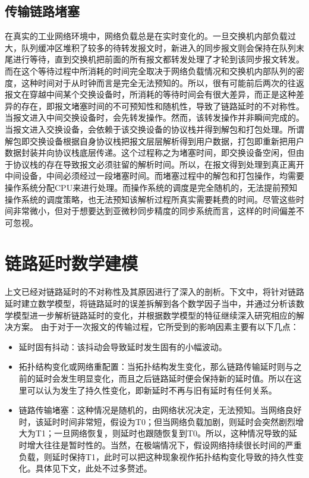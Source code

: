 \subsection{传输链路堵塞}
在真实的工业网络环境中，网络负载总是在实时变化的。一旦交换机内部负载过大，队列缓冲区堆积了较多的待转发报文时，新进入的同步报文则会保持在队列末尾进行等待，直到交换机把前面的所有报文都转发处理了才轮到该同步报文转发。而在这个等待过程中所消耗的时间完全取决于网络负载情况和交换机内部队列的密度，这种时间对于从时钟而言是完全无法预知的。所以，很有可能前后两次的往返报文在穿越中间某个交换设备时，所消耗的等待时间会有很大差异，而正是这种差异的存在，即报文堵塞时间的不可预知性和随机性，导致了链路延时的不对称性。当报文进入中间交换设备时，会先转发操作。然而，该转发操作并非瞬间完成的。当报文进入交换设备，会依赖于该交换设备的协议栈并得到解包和打包处理。所谓解包即交换设备根据自身协议栈把报文层层解析得到用户数据，打包即重新把用户数据封装并向协议栈底层传递。这个过程称之为堵塞时间，即交换设备空闲，但由于协议栈的存在导致报文必须驻留的解析时间。所以，在报文得到处理到真正离开中间设备，中间必须经过一段堵塞时间。而堵塞过程中的解包和打包操作，均需要操作系统分配CPU来进行处理。而操作系统的调度是完全随机的，无法提前预知操作系统的调度策略，也无法预知该解析过程所真实需要耗费的时间。尽管这些时间非常微小，但对于想要达到亚微秒同步精度的同步系统而言，这样的时间偏差不可忽视。

\section{链路延时数学建模}
上文已经对链路延时的不对称性及其原因进行了深入的剖析。下文中，将针对链路延时建立数学模型，将链路延时的误差拆解到各个数学因子当中，并通过分析该数学模型进一步解析链路延时的变化，并根据数学模型的特征继续深入研究相应的解决方案。
由于对于一次报文的传输过程，它所受到的影响因素主要有以下几点：
\begin{itemize}[noitemsep,topsep=0pt,parsep=0pt,partopsep=0pt]
	\item 延时固有抖动：该抖动会导致延时发生固有的小幅波动。
	\item 拓扑结构变化或网络重配置：当拓扑结构发生变化，那么链路传输延时则与之前的延时会发生明显变化，而且之后链路延时便会保持新的延时值。所以在这里可以认为发生了持久性变化，即新延时不再与旧有延时有任何关系。
  \item 链路传输堵塞：这种情况是随机的，由网络状况决定，无法预知。当网络良好时，该延时时间非常短，假设为T0；但当网络负载加剧，则延时会突然剧烈增大为T1；一旦网络恢复，则延时也跟随恢复到T0。所以，这种情况导致的延时增大往往是暂时性的。当然，在极端情况下，假设网络持续很长时间的严重负载，则延时保持T1，此时可以把这种现象视作拓扑结构变化导致的持久性变化。具体见下文，此处不过多赘述。
\end{itemize}

